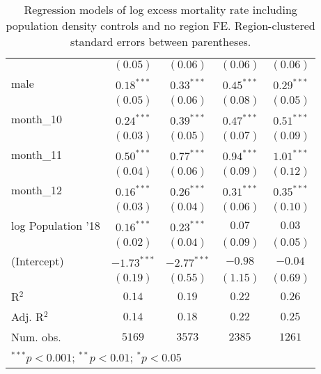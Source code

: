 \begin{table}
\begin{center}
\begin{tabular}{l c c c c}
                   & $(0.05)$      & $(0.06)$      & $(0.06)$      & $(0.06)$      \\
male               & $0.18^{***}$  & $0.33^{***}$  & $0.45^{***}$  & $0.29^{***}$  \\
                   & $(0.05)$      & $(0.06)$      & $(0.08)$      & $(0.05)$      \\
month\_10          & $0.24^{***}$  & $0.39^{***}$  & $0.47^{***}$  & $0.51^{***}$  \\
                   & $(0.03)$      & $(0.05)$      & $(0.07)$      & $(0.09)$      \\
month\_11          & $0.50^{***}$  & $0.77^{***}$  & $0.94^{***}$  & $1.01^{***}$  \\
                   & $(0.04)$      & $(0.06)$      & $(0.09)$      & $(0.12)$      \\
month\_12          & $0.16^{***}$  & $0.26^{***}$  & $0.31^{***}$  & $0.35^{***}$  \\
                   & $(0.03)$      & $(0.04)$      & $(0.06)$      & $(0.10)$      \\
log Population '18 & $0.16^{***}$  & $0.23^{***}$  & $0.07$        & $0.03$        \\
                   & $(0.02)$      & $(0.04)$      & $(0.09)$      & $(0.05)$      \\
(Intercept)        & $-1.73^{***}$ & $-2.77^{***}$ & $-0.98$       & $-0.04$       \\
                   & $(0.19)$      & $(0.55)$      & $(1.15)$      & $(0.69)$      \\
\hline
R$^2$              & $0.14$        & $0.19$        & $0.22$        & $0.26$        \\
Adj. R$^2$         & $0.14$        & $0.18$        & $0.22$        & $0.25$        \\
Num. obs.          & $5169$        & $3573$        & $2385$        & $1261$        \\
\hline
\multicolumn{5}{l}{\scriptsize{$^{***}p<0.001$; $^{**}p<0.01$; $^{*}p<0.05$}}
\end{tabular}
\caption{Regression models of log excess mortality rate including population density controls and no region FE. Region-clustered standard errors between parentheses.}
\label{tab:popdensmodels}
\end{center}
\end{table}
